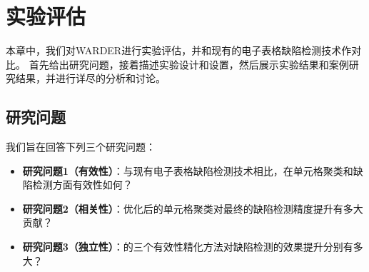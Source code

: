 \chapter{实验评估}

本章中，我们对WARDER进行实验评估，并和现有的电子表格缺陷检测技术作对比。
首先给出研究问题，接着描述实验设计和设置，然后展示实验结果和案例研究结果，并进行详尽的分析和讨论。


\section{研究问题}
我们旨在回答下列三个研究问题：
\begin{itemize}
    \item \textbf{研究问题1（有效性）}：与现有电子表格缺陷检测技术相比，\wa 在单元格聚类和缺陷检测方面有效性如何？
    \item \textbf{研究问题2（相关性）}：\wa 优化后的单元格聚类对最终的缺陷检测精度提升有多大贡献？
    \item \textbf{研究问题3（独立性）}：\wa 的三个有效性精化方法对缺陷检测的效果提升分别有多大？
\end{itemize}




